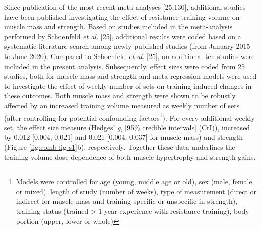 \documentclass[twoside,10pt]{gihclass} %
\begin{document}
Since publication of the most recent meta-analyses {[}25,130{]},
additional studies have been published investigating the effect of resistance training volume on muscle mass and strength. Based on studies included in the meta-analysis performed by Schoenfeld \emph{et al.} {[}25{]}, additional results were coded based on a systematic literature search among newly published studies (from January 2015 to June 2020). Compared to Schoenfeld \emph{et al.} {[}25{]}, an additional ten studies were included in the present analysis.
Subsequently, effect sizes were coded from 25 studies, both for muscle mass and strength and meta-regression models were used to investigate the effect of weekly number of sets on training-induced changes in these outcomes.
Both muscle mass and strength were shown to be robustly affected by an increased training volume measured as weekly number of sets (after controlling for potential confounding factors\footnote{Models were controlled for age (young, middle age or old), sex (male, female or mixed), length of study (number of weeks), type of measurement (direct or indirect for muscle mass and training-specific or unspecific in strength), training status (trained \textgreater{} 1 year experience with resistance training), body portion (upper, lower or whole)}).
For every additional weekly set, the effect size measure (Hedges' \emph{g}, {[}95\% credible intervals{]} (CrI)), increased by
0.012 {[}0.004, 0.021{]} and 0.021 {[}0.004, 0.037{]}
for muscle mass)
and strength (Figure \ref{fig:comb-fig-s1}b),
respectively.
Together these data underlines the training volume dose-dependence of both muscle hypertrophy and strength gains.
\end{document}
